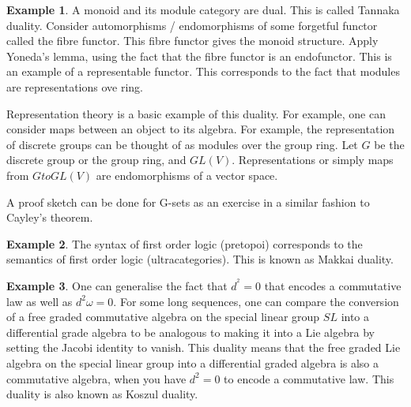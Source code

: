 \documentclass[10pt]{article}
\theoremstyle{plain}%
\theoremstyle{definition}
\newtheorem{example}{Example}[section]
\theoremstyle{remark}
\begin{document}
\begin{example}
	A monoid and its module category are dual. This is called Tannaka duality. Consider automorphisms / endomorphisms of some forgetful functor called the fibre functor. This fibre functor gives the monoid structure. Apply Yoneda's lemma, using the fact that the fibre functor is an endofunctor. This is an example of a representable functor. This corresponds to the fact that modules are representations ove ring.

	Representation theory is a basic example of this duality. For example, one can consider maps between an object to its algebra. For example, the representation of discrete groups can be thought of as modules over the group ring. Let $G$ be the discrete group or the group ring, and $GL(V)$. Representations or simply maps from $G to GL(V)$ are endomorphisms of a vector space.

	A proof sketch can be done for G-sets as an exercise in a similar fashion to Cayley's theorem.
\end{example}

\begin{example}
	The syntax of first order logic (pretopoi) corresponds to the semantics of first order logic (ultracategories). This is known as Makkai duality.
\end{example}

\begin{example}
	One can generalise the fact that $d^^2 = 0$ that encodes a commutative law as well as $d^2 \omega = 0$. For some long sequences, one can compare the conversion of a free graded commutative algebra on the special linear group $SL$ into a differential grade algebra to be analogous to making it into a Lie algebra by setting the Jacobi identity to vanish. This duality means that the free graded Lie algebra on the special linear group into a differential graded algebra is also a commutative algebra, when you have $d^2 = 0$ to encode a commutative law. This duality is also known as Koszul duality.
\end{example}
\end{document}
